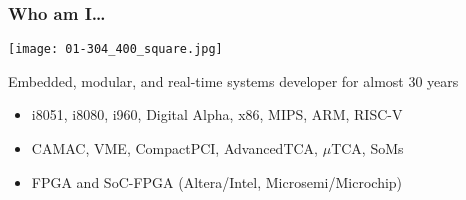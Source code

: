 \begin{frame}
  \frametitle{Who am I\dots}

  \vspace{.5cm}

  \begin{flushleft}
    \texttt{[image: 01-304\_400\_square.jpg]}
  \end{flushleft}
  \vspace{-5cm}

  Embedded, modular, and real-time systems developer for almost 30 years

  \vspace{1cm}

  \begin{flushright}
    \begin{minipage}{10.5cm}

      \begin{itemize}
      \item i8051, i8080, i960, Digital Alpha, x86, MIPS, ARM, RISC-V
      \item CAMAC, VME, CompactPCI, AdvancedTCA, $\mu$TCA, SoMs
      \item FPGA and SoC-FPGA (Altera/Intel, Microsemi/Microchip)
      \end{itemize}
    \end{minipage}
  \end{flushright}


\end{frame}
